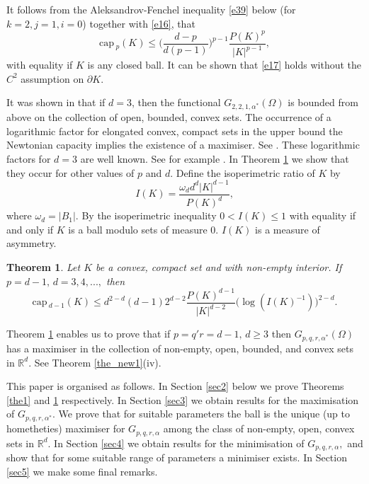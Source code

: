 \documentclass[a4paper,9pt]{article}
\newcommand{\R}{\mathbb{R}}
\newtheorem{theorem}{Theorem}
\def\cp{\mathrm{cap}\,}
\newcommand{\Om}{\Omega}
\begin{document}
It follows from the Aleksandrov-Fenchel inequality \eqref{e39} below (for $k=2,j=1,i=0$) together with \eqref{e16}, that
\begin{equation}\label{e17}
\cp_p(K)\le \Big(\frac{d-p}{d(p-1)}\Big)^{p-1}\frac{P(K)^p}{|K|^{p-1}},
\end{equation}
with equality if $K$ is any closed ball.  It can be shown that \eqref{e17} holds without the $C^2$ assumption on $\partial K$.

It was shown in \cite[Theorem 2(iii)]{vdB1} that if $d=3$, then the functional $G_{2,2,1,\alpha^*}(\Om)$ is bounded from above on the collection of  open, bounded,  convex sets.
The occurrence of a logarithmic factor for elongated convex, compact sets in the upper bound the Newtonian capacity implies the existence of a maximiser. See \cite[p.354]{vdB1}. These logarithmic factors for $d=3$ are well known. See for example \cite[p.260]{IMcK}.
In Theorem \ref{the2} we show that they occur for other values of $p$ and $d$.
Define the isoperimetric  ratio of $K$ by
\begin{equation}\label{e18}
I(K)=\frac{\omega_dd^d|K|^{d-1}}{P(K)^d},
\end{equation}
where $\omega_d=|B_1|$. By the isoperimetric inequality $0<I(K)\le 1$ with equality if and only if $K$ is a ball modulo sets of measure $0$. $I(K)$ is a measure of asymmetry.
\begin{theorem}\label{the2} Let $K$ be a convex, compact set and with non-empty interior. If $p=d-1,\,d=3,4,...,$ then
\begin{equation*}%
\cp_{d-1}(K)\le d^{2-d}(d-1)2^{d-2}\frac{P(K)^{d-1}}{|K|^{d-2}}\Big(\log (I(K)^{-1})\Big)^{2-d}.
\end{equation*}
\end{theorem}

Theorem \ref{the2} enables us to prove that if  $p=q'r=d-1,\,d\ge 3$ then $G_{p,q,r,\alpha^*}(\Om)$ has a maximiser in the collection of non-empty, open, bounded, and convex sets in $\R^d$. See Theorem \ref{the_new1}(iv).

This paper is organised as follows. In Section \ref{sec2} below we prove Theorems \ref{the1}  and \ref{the2} respectively.
In Section \ref{sec3} we obtain results for the maximisation of $G_{p,q,r,\alpha^*}.$  We prove that for suitable parameters the ball is the unique
(up to hometheties) maximiser for $G_{p,q,r,\alpha}$ among the class of non-empty, open, convex sets in $\R^d$. In Section \ref{sec4} we obtain results for the minimisation of $G_{p,q,r,\alpha},$ and show that for some suitable range of parameters a minimiser exists.  In Section \ref{sec5} we make some final remarks.
\end{document}
